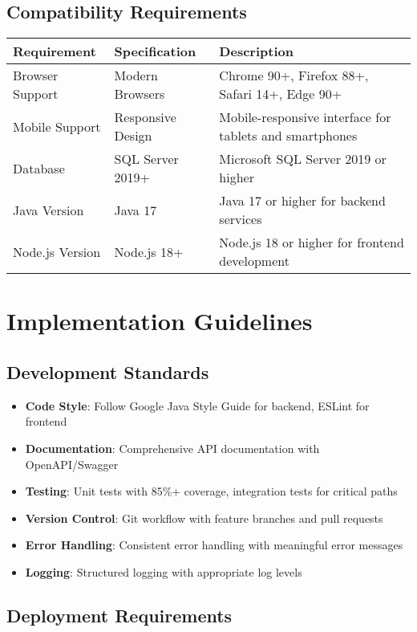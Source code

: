 \documentclass[12pt,a4paper]{article}
\begin{document}
\subsection{Compatibility Requirements}

\begin{longtable}{|p{2cm}|p{3cm}|p{9cm}|}
\hline
\textbf{Requirement} & \textbf{Specification} & \textbf{Description} \\
\hline
Browser Support & Modern Browsers & Chrome 90+, Firefox 88+, Safari 14+, Edge 90+ \\
\hline
Mobile Support & Responsive Design & Mobile-responsive interface for tablets and smartphones \\
\hline
Database & SQL Server 2019+ & Microsoft SQL Server 2019 or higher \\
\hline
Java Version & Java 17 & Java 17 or higher for backend services \\
\hline
Node.js Version & Node.js 18+ & Node.js 18 or higher for frontend development \\
\hline
\end{longtable}

\section{Implementation Guidelines}

\subsection{Development Standards}

\begin{itemize}
    \item \textbf{Code Style}: Follow Google Java Style Guide for backend, ESLint for frontend
    \item \textbf{Documentation}: Comprehensive API documentation with OpenAPI/Swagger
    \item \textbf{Testing}: Unit tests with 85\%+ coverage, integration tests for critical paths
    \item \textbf{Version Control}: Git workflow with feature branches and pull requests
    \item \textbf{Error Handling}: Consistent error handling with meaningful error messages
    \item \textbf{Logging}: Structured logging with appropriate log levels
\end{itemize}

\subsection{Deployment Requirements}
\end{document}
